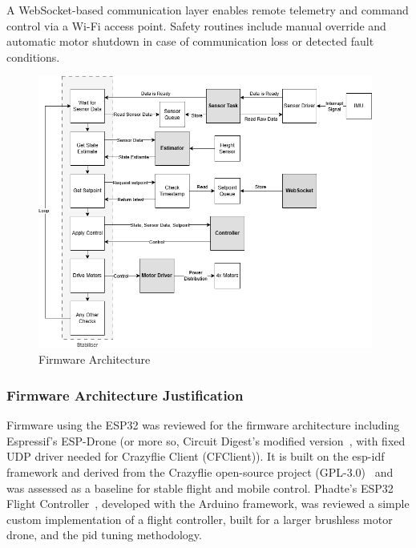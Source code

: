 A WebSocket-based communication layer enables remote telemetry and command control via a Wi-Fi access point. Safety routines include manual override and automatic motor shutdown in case of communication loss or detected fault conditions.

\begin{figure}[H]
    \centering
    \captionsetup{justification=centering, margin=1cm}
    \includegraphics[width=0.98\textwidth]{img/block-software-gray2.PNG}
    \caption{Firmware Architecture}
    \label{fig:block-software}
\end{figure}

\subsubsection{Firmware Architecture Justification}

Firmware using the ESP32 was reviewed for the firmware architecture including Espressif’s ESP-Drone (or more so, Circuit Digest’s modified version~\temp{[D]}, with fixed UDP driver needed for Crazyflie Client (CFClient)). It is built on the \gls{esp-idf} framework and derived from the Crazyflie open-source project (GPL-3.0)~\temp{[C]} and was assessed as a baseline for stable flight and mobile control. Phadte’s ESP32 Flight Controller~\temp{[E]}, developed with the Arduino framework, was reviewed a simple custom implementation of a flight controller, built for a larger brushless motor drone, and the \gls{pid} tuning methodology.  

